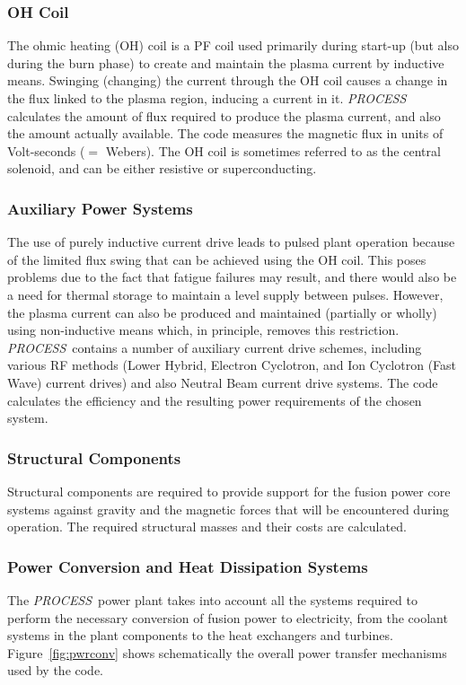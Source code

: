 \documentclass[11pt,a4paper]{report}
\newcommand{\PS}{\mbox{\it PROCESS\/ }}
\begin{document}
\subsubsection{OH Coil}
The ohmic heating (OH) coil is a PF coil used primarily during start-up (but
also during the burn phase) to create and maintain the plasma current by
inductive means. Swinging (changing) the current through the OH coil causes a
change in the flux linked to the plasma region, inducing a current in it. \PS
calculates the amount of flux required to produce the plasma current, and also
the amount actually available. The code measures the magnetic flux in units of
Volt-seconds ($=$ Webers). The OH coil is sometimes referred to as the central
solenoid, and can be either resistive or superconducting.

\subsubsection{Auxiliary Power Systems}
The use of purely inductive current drive leads to pulsed plant operation
because of the limited flux swing that can be achieved using the OH coil. This
poses problems due to the fact that fatigue failures may result, and there
would also be a need for thermal storage to maintain a level supply between
pulses. However, the plasma current can also be produced and maintained
(partially or wholly) using non-inductive means which, in principle, removes
this restriction. \PS contains a number of auxiliary current drive schemes,
including various RF methods (Lower Hybrid, Electron Cyclotron, and Ion
Cyclotron (Fast Wave) current drives) and also Neutral Beam current drive
systems. The code calculates the efficiency and the resulting power
requirements of the chosen system.

\subsubsection{Structural Components}
Structural components are required to provide support for the fusion power
core systems against gravity and the magnetic forces that will be encountered
during operation. The required structural masses and their costs are
calculated.

\subsubsection{Power Conversion and Heat Dissipation Systems}
The \PS power plant takes into account all the systems required to perform the
necessary conversion of fusion power to electricity, from the coolant systems
in the plant components to the heat exchangers and turbines.
Figure~\ref{fig:pwrconv} shows schematically the overall power transfer
mechanisms used by the code.
\end{document}

